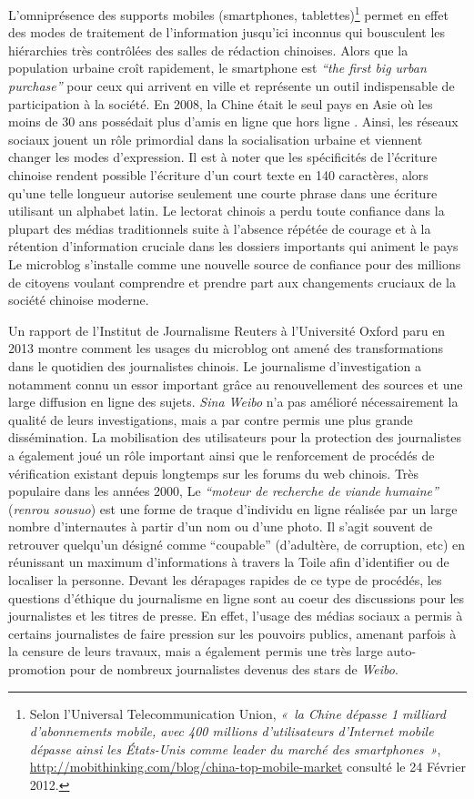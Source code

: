 L’omniprésence des supports mobiles (smartphones, tablettes)\footnote{Selon l’Universal Telecommunication Union, \textit{« la Chine dépasse 1 milliard d’abonnements mobile, avec 400 millions d’utilisateurs d’Internet mobile dépasse ainsi les États-Unis comme leader du marché des smartphones »}, \url{http://mobithinking.com/blog/china-top-mobile-market} consulté le 24 Février 2012.} permet en effet des modes de traitement de l’information jusqu’ici inconnus qui bousculent les hiérarchies très contrôlées des salles de rédaction chinoises. Alors que la population urbaine croît rapidement, le smartphone est \textit{“the first big urban purchase”} \citep{Wallis2013} pour ceux qui arrivent en ville et représente un outil indispensable de participation à la société. En 2008, la Chine était le seul pays en Asie où les moins de 30 ans possédait plus d’amis en ligne que hors ligne \citep{Hinckley2009}. Ainsi, les réseaux sociaux jouent un rôle primordial dans la socialisation urbaine et viennent changer les modes d’expression. Il est à noter que les spécificités de l’écriture chinoise rendent possible l’écriture d’un court texte en 140 caractères, alors qu’une telle longueur autorise seulement une courte phrase dans une écriture utilisant un alphabet latin. Le lectorat chinois a perdu toute confiance dans la plupart des médias traditionnels suite à l’absence répétée de courage et à la rétention d’information cruciale dans les dossiers importants qui animent le pays Le microblog s’installe comme une nouvelle source de confiance pour des millions de citoyens voulant comprendre et prendre part aux changements cruciaux de la société chinoise moderne.

Un rapport de l’Institut de Journalisme Reuters à l’Université Oxford paru en 2013 montre comment les usages du microblog ont amené des transformations dans le quotidien des journalistes chinois. Le journalisme d’investigation a notamment connu un essor important grâce au renouvellement des sources et une large diffusion en ligne des sujets. \textit{Sina Weibo} n’a pas amélioré nécessairement la qualité de leurs investigations, mais a par contre permis une plus grande dissémination. La mobilisation des utilisateurs pour la protection des journalistes a également joué un rôle important ainsi que le renforcement de procédés de vérification existant depuis longtemps sur les forums du web chinois. Très populaire dans les années 2000, Le \textit{“moteur de recherche de viande humaine”} (\textit{renrou sousuo}) est une forme de traque d’individu en ligne réalisée par un large nombre d’internautes à partir d’un nom ou d’une photo. Il s’agit souvent de retrouver quelqu’un désigné comme “coupable” (d’adultère, de corruption, etc) en réunissant un maximum d’informations à travers la Toile afin d’identifier ou de localiser la personne. Devant les dérapages rapides de ce type de procédés, les questions d’éthique du journalisme en ligne sont au coeur des discussions pour les journalistes et les titres de presse. En effet, l’usage des médias sociaux a permis à certains journalistes de faire pression sur les pouvoirs publics, amenant parfois à la censure de leurs travaux, mais a également permis une très large auto-promotion pour de nombreux journalistes devenus des stars de \textit{Weibo}.

